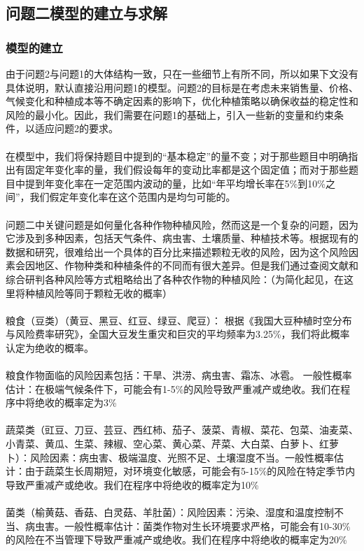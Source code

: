 \documentclass[withoutpreface]{cumcmthesis}
\begin{document}
\subsection{问题二模型的建立与求解}
\subsubsection{模型的建立}
由于问题2与问题1的大体结构一致，只在一些细节上有所不同，所以如果下文没有具体说明，默认直接沿用问题1的模型。问题2的目标是在考虑未来销售量、价格、气候变化和种植成本等不确定因素的影响下，优化种植策略以确保收益的稳定性和风险的最小化。因此，我们需要在问题1的基础上，引入一些新的变量和约束条件，以适应问题2的要求。\\\\
在模型中，我们将保持题目中提到的“基本稳定”的量不变；对于那些题目中明确指出有固定年变化率的量，我们假设每年的变动比率都是这个固定值；而对于那些题目中提到年变化率在一定范围内波动的量，比如“年平均增长率在5\%到10\%之间”，我们假定年变化率在这个范围内是均匀可能的。\\\\
问题二中关键问题是如何量化各种作物种植风险，然而这是一个复杂的问题，因为它涉及到多种因素，包括天气条件、病虫害、土壤质量、种植技术等。根据现有的数据和研究，很难给出一个具体的百分比来描述颗粒无收的风险，因为这个风险因素会因地区、作物种类和种植条件的不同而有很大差异。但是我们通过查阅文献和综合研判各种风险等方式粗略给出了各种农作物的种植风险：（为简化起见，在这里将种植风险等同于颗粒无收的概率）\\\\
粮食（豆类）（黄豆、黑豆、红豆、绿豆、爬豆）：
根据《我国大豆种植时空分布与风险费率研究》\cite{ref2}，全国大豆发生重灾和巨灾的平均频率为3.25\%，我们将此概率认定为绝收的概率。 \\\\
粮食作物面临的风险因素包括：干旱、洪涝、病虫害、霜冻、冰雹。
一般性概率估计：在极端气候条件下，可能会有1-5\%的风险导致严重减产或绝收。我们在程序中将绝收的概率定为3\%\\\\
蔬菜类（豇豆、刀豆、芸豆、西红柿、茄子、菠菜、青椒、菜花、包菜、油麦菜、小青菜、黄瓜、生菜、辣椒、空心菜、黄心菜、芹菜、大白菜、白萝卜、红萝卜）：风险因素：病虫害、极端温度、光照不足、土壤湿度不当。一般性概率估计：由于蔬菜生长周期短，对环境变化敏感，可能会有5-15\%的风险在特定季节内导致严重减产或绝收。我们在程序中将绝收的概率定为10\%\\\\
菌类（榆黄菇、香菇、白灵菇、羊肚菌）：风险因素：污染、湿度和温度控制不当、病虫害。一般性概率估计：菌类作物对生长环境要求严格，可能会有10-30\%的风险在不当管理下导致严重减产或绝收。我们在程序中将绝收的概率定为20\%\\\\
\end{document}
